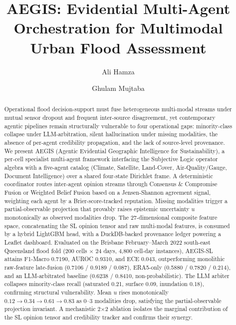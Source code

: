 \documentclass[a4paper,fleqn]{cas-dc}
\begin{document}
\let\WriteBookmarks\relax
\def\floatpagepagefraction{1}
\def\textpagefraction{0.001}


\title[mode=title]{AEGIS: Evidential Multi-Agent Orchestration for Multimodal Urban Flood Assessment}


\author[1]{Ali Hamza}
\cormark[1]

\author[2]{Ghulam Mujtaba}

\address[1]{National University of Sciences and Technology (NUST), Islamabad, Pakistan}

\address[2]{National University of Computer and Emerging Sciences (FAST-NUCES), Islamabad, Pakistan}


\begin{abstract}
Operational flood decision-support must fuse heterogeneous multi-modal streams under mutual sensor dropout and frequent inter-source disagreement, yet contemporary agentic pipelines remain structurally vulnerable to four operational gaps: minority-class collapse under LLM-arbitration, silent hallucination under missing modalities, the absence of per-agent credibility propagation, and the lack of source-level provenance. We present AEGIS (Agentic Evidential Geographic Intelligence for Sustainability), a per-cell specialist multi-agent framework interfacing the Subjective Logic operator algebra with a five-agent catalog (Climate, Satellite, Land-Cover, Air-Quality/Gauge, Document Intelligence) over a shared four-state Dirichlet frame. A deterministic coordinator routes inter-agent opinion streams through Consensus \& Compromise Fusion or Weighted Belief Fusion based on a Jensen-Shannon agreement signal, weighting each agent by a Brier-score-tracked reputation. Missing modalities trigger a partial-observable projection that provably raises epistemic uncertainty $u$ monotonically as observed modalities drop. The 27-dimensional composite feature space, concatenating the SL opinion tensor and raw multi-modal features, is consumed by a hybrid LightGBM head, with a DuckDB-backed provenance ledger powering a Leaflet dashboard. Evaluated on the Brisbane February--March 2022 south-east Queensland flood fold (200 cells $\times$ 24 days, 4,800 cell-day instances), AEGIS-SL attains F1-Macro 0.7190, AUROC 0.9310, and ECE 0.043, outperforming monolithic raw-feature late-fusion (0.7106 / 0.9189 / 0.087), ERA5-only (0.5880 / 0.7820 / 0.214), and an LLM-arbitrated baseline (0.6238 / 0.8410, non-probabilistic). The LLM arbiter collapses minority-class recall (saturated 0.21, surface 0.09, inundation 0.18), confirming structural vulnerability. Mean $u$ rises monotonically $0.12 \to 0.34 \to 0.61 \to 0.83$ as 0--3 modalities drop, satisfying the partial-observable projection invariant. A mechanistic 2$\times$2 ablation isolates the marginal contribution of the SL opinion tensor and credibility tracker and confirms their synergy.
\end{abstract}
\end{document}
